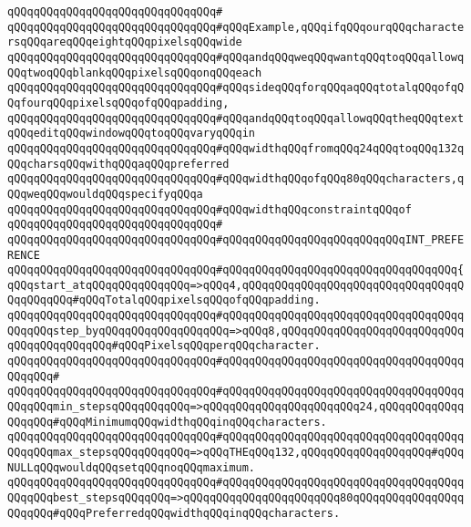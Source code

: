 \verb|qQQqqQQqqQQqqQQqqQQqqQQqqQQqqQQq#|\newline
\verb|qQQqqQQqqQQqqQQqqQQqqQQqqQQqqQQq#qQQqExample,qQQqifqQQqourqQQqcharactersqQQqareqQQqeightqQQqpixelsqQQqwide|\newline
\verb|qQQqqQQqqQQqqQQqqQQqqQQqqQQqqQQq#qQQqandqQQqweqQQqwantqQQqtoqQQqallowqQQqtwoqQQqblankqQQqpixelsqQQqonqQQqeach|\newline
\verb|qQQqqQQqqQQqqQQqqQQqqQQqqQQqqQQq#qQQqsideqQQqforqQQqaqQQqtotalqQQqofqQQqfourqQQqpixelsqQQqofqQQqpadding,|\newline
\verb|qQQqqQQqqQQqqQQqqQQqqQQqqQQqqQQq#qQQqandqQQqtoqQQqallowqQQqtheqQQqtextqQQqeditqQQqwindowqQQqtoqQQqvaryqQQqin|\newline
\verb|qQQqqQQqqQQqqQQqqQQqqQQqqQQqqQQq#qQQqwidthqQQqfromqQQq24qQQqtoqQQq132qQQqcharsqQQqwithqQQqaqQQqpreferred|\newline
\verb|qQQqqQQqqQQqqQQqqQQqqQQqqQQqqQQq#qQQqwidthqQQqofqQQq80qQQqcharacters,qQQqweqQQqwouldqQQqspecifyqQQqa|\newline
\verb|qQQqqQQqqQQqqQQqqQQqqQQqqQQqqQQq#qQQqwidthqQQqconstraintqQQqof|\newline
\verb|qQQqqQQqqQQqqQQqqQQqqQQqqQQqqQQq#|\newline
\verb|qQQqqQQqqQQqqQQqqQQqqQQqqQQqqQQq#qQQqqQQqqQQqqQQqqQQqqQQqqQQqINT_PREFERENCE|\newline
\verb|qQQqqQQqqQQqqQQqqQQqqQQqqQQqqQQq#qQQqqQQqqQQqqQQqqQQqqQQqqQQqqQQqqQQq{qQQqstart_atqQQqqQQqqQQqqQQq=>qQQq4,qQQqqQQqqQQqqQQqqQQqqQQqqQQqqQQqqQQqqQQqqQQq#qQQqTotalqQQqpixelsqQQqofqQQqpadding.|\newline
\verb|qQQqqQQqqQQqqQQqqQQqqQQqqQQqqQQq#qQQqqQQqqQQqqQQqqQQqqQQqqQQqqQQqqQQqqQQqqQQqstep_byqQQqqQQqqQQqqQQqqQQq=>qQQq8,qQQqqQQqqQQqqQQqqQQqqQQqqQQqqQQqqQQqqQQqqQQq#qQQqPixelsqQQqperqQQqcharacter.|\newline
\verb|qQQqqQQqqQQqqQQqqQQqqQQqqQQqqQQq#qQQqqQQqqQQqqQQqqQQqqQQqqQQqqQQqqQQqqQQqqQQq#|\newline
\verb|qQQqqQQqqQQqqQQqqQQqqQQqqQQqqQQq#qQQqqQQqqQQqqQQqqQQqqQQqqQQqqQQqqQQqqQQqqQQqmin_stepsqQQqqQQqqQQq=>qQQqqQQqqQQqqQQqqQQqqQQq24,qQQqqQQqqQQqqQQqqQQq#qQQqMinimumqQQqwidthqQQqinqQQqcharacters.|\newline
\verb|qQQqqQQqqQQqqQQqqQQqqQQqqQQqqQQq#qQQqqQQqqQQqqQQqqQQqqQQqqQQqqQQqqQQqqQQqqQQqmax_stepsqQQqqQQqqQQq=>qQQqTHEqQQq132,qQQqqQQqqQQqqQQqqQQq#qQQqNULLqQQqwouldqQQqsetqQQqnoqQQqmaximum.|\newline
\verb|qQQqqQQqqQQqqQQqqQQqqQQqqQQqqQQq#qQQqqQQqqQQqqQQqqQQqqQQqqQQqqQQqqQQqqQQqqQQqbest_stepsqQQqqQQq=>qQQqqQQqqQQqqQQqqQQqqQQq80qQQqqQQqqQQqqQQqqQQqqQQq#qQQqPreferredqQQqwidthqQQqinqQQqcharacters.|\newline
